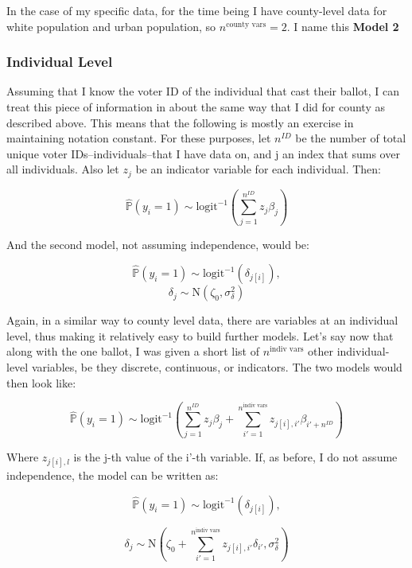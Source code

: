 \documentclass[12pt,twoside]{reedthesis}
\begin{document}
  In the case of my specific data, for the time being I have county-level
  data for white population and urban population, so
  \(n^{\text{county vars}} = 2\). I name this \textbf{Model 2}
  
  \subsubsection{Individual Level}\label{individual-level}
  
  Assuming that I know the voter ID of the individual that cast their
  ballot, I can treat this piece of information in about the same way that
  I did for county as described above. This means that the following is
  mostly an exercise in maintaining notation constant. For these purposes,
  let \(n^{ID}\) be the number of total unique voter
  IDs--individuals--that I have data on, and j an index that sums over all
  individuals. Also let \(z_{j}\) be an indicator variable for each
  individual. Then:
  
  \[\hat{\mathbb{P}}(y_i = 1) \sim \text{logit}^{-1}(\sum_{j = 1}^{n^{ID}}z_{j}\beta_{j})\]
  
  And the second model, not assuming independence, would be:
  
  \[\hat{\mathbb{P}}(y_i = 1) \sim \text{logit}^{-1}(\delta_{j[i]}), \]
  \[\delta_{j} \sim \text{N}(\zeta_0, \sigma_{\delta}^2)\]
  
  Again, in a similar way to county level data, there are variables at an
  individual level, thus making it relatively easy to build further
  models. Let's say now that along with the one ballot, I was given a
  short list of \(n^{\text{indiv vars}}\) other individual-level
  variables, be they discrete, continuous, or indicators. The two models
  would then look like:
  
  \[\hat{\mathbb{P}}(y_i = 1) \sim \text{logit}^{-1}(\sum_{j = 1}^{n^{ID}}z_{j}\beta_{j} + \sum_{i'=1}^{n^{\text{indiv vars}}}z_{j[i], i'}\beta_{i'+n^{ID}})\]
  
  Where \(z_{j[i], l}\) is the j-th value of the i'-th variable. If, as
  before, I do not assume independence, the model can be written as:
  
  \begin{equation} \tag{Model 3*}
  \hat{\mathbb{P}}(y_i = 1) \sim \text{logit}^{-1}(\delta_{j[i]}),
  \end{equation}
  
  \[\delta_{j} \sim \text{N}(\zeta_0 + \sum_{i'=1}^{n^{\text{indiv vars}}}z_{j[i], i'}\delta_{i'}, \sigma_{\delta}^2)\]
  
\end{document}
